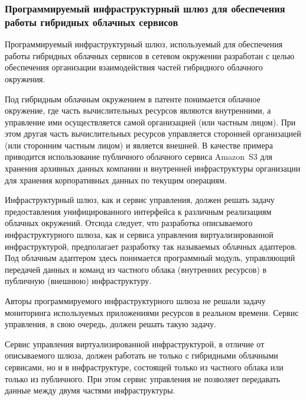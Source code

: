 \subsubsection*{Программируемый инфраструктурный шлюз для обеспечения работы гибридных облачных сервисов}
Программируемый инфраструктурный шлюз, используемый для обеспечения работы гибридных облачных сервисов в сетевом окружении\cite{programmable-infrastructure-gateway} разработан с целью обеспечения организации взаимодействия частей гибридного облачного окружения.

Под гибридным облачным окружением в патенте понимается облачное окружение, где часть вычислительных ресурсов являются внутренними, а управление ими осуществляется самой организацией (или частным лицом). 
При этом другая часть вычислительных ресурсов управляется сторонней организацией (или сторонним частным лицом) и является внешней. 
В качестве примера приводится использование публичного облачного сервиса Amazon~S3\textsuperscript{\texttrademark} для хранения архивных данных компании и внутренней инфраструктуры организации для хранения корпоративных данных по текущим операциям.

Инфраструктурный шлюз, как и сервис управления, должен решать задачу предоставления унифицированного интерфейса к различным реализациям облачных окружений. 
Отсюда следует, что разработка описываемого инфраструктурного шлюза, как и сервиса управления виртуализированной инфраструктурой, предполагает разработку так называемых облачных адаптеров. 
Под облачным адаптером здесь понимается программный модуль, управляющий передачей данных и команд из частного облака (внутренних ресурсов) в  публичную (внешнюю) инфраструктуру.

Авторы программируемого инфраструктурного шлюза не решали задачу мониторинга используемых приложениями ресурсов в реальном времени. 
Сервис управления, в свою очередь, должен решать такую задачу.

Сервис управления виртуализированной инфраструктурой, в отличие от описываемого шлюза, должен работать не только с гибридными облачными сервисами, но и в инфраструктуре, состоящей только из частного облака или только из публичного.
При этом сервис управления не позволяет передавать данные между двумя частями инфраструктуры.